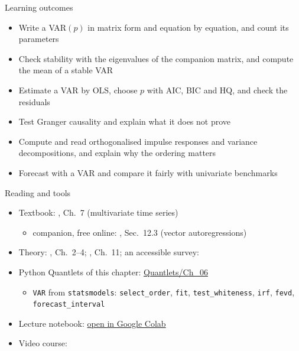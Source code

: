 \begin{frame}{Learning outcomes}
\itemsize{\small}
\begin{itemize}
    \item Write a VAR$(p)$ in matrix form and equation by equation, and count its parameters
    \item Check stability with the eigenvalues of the companion matrix, and compute the mean of a stable VAR
    \item Estimate a VAR by OLS, choose $p$ with AIC, BIC and HQ, and check the residuals
    \item Test Granger causality and explain what it does not prove
    \item Compute and read orthogonalised impulse responses and variance decompositions, and explain why the ordering matters
    \item Forecast with a VAR and compare it fairly with univariate benchmarks
\end{itemize}
\end{frame}

\begin{frame}{Reading and tools}
\itemsize{\small}
\begin{itemize}
    \item Textbook: , Ch.~7 (multivariate time series)
    \begin{itemize}
        \item companion, free online: , Sec.~12.3 (vector autoregressions)
    \end{itemize}
    \item Theory: , Ch.~2--4; , Ch.~11; an accessible survey: 
    \item Python Quantlets of this chapter: \href{https://github.com/danpele/Time-Series-Analysis/tree/main/Quantlets/Ch_06}{Quantlets/Ch\_06}
    \begin{itemize}
        \item \texttt{VAR} from \texttt{statsmodels}: \texttt{select\_order}, \texttt{fit}, \texttt{test\_whiteness}, \texttt{irf}, \texttt{fevd}, \texttt{forecast\_interval}
    \end{itemize}
    \item Lecture notebook: \href{\colaburl{notebooks/EN/chapter6_lecture_notebook.ipynb}}{open in Google Colab}
    \item Video course: 
\end{itemize}
\end{frame}


